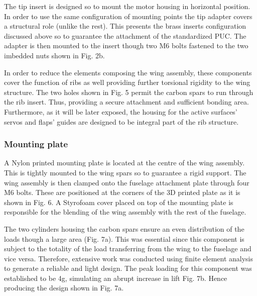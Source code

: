\documentclass[../../main.tex]{subfiles}
\begin{document}

The tip insert is designed so to mount the motor housing in horizontal position.
In order to use the same configuration of mounting points the tip adapter covers a structural role (unlike the rest).
This presents the brass inserts configuration discussed above so to guarantee the attachment of the standardized PUC.
The adapter is then mounted to the insert though two M6 bolts fastened to the two imbedded nuts shown in Fig. 2b. 

In order to reduce the elements composing the wing assembly, these components cover the function of ribs as well providing further torsional rigidity to the wing structure.
The two holes shown in Fig. 5 permit the carbon spars to run through the rib insert.
Thus, providing a secure attachment and sufficient bonding area.
Furthermore, as it will be later exposed, the housing for the active surfaces’ servos and flaps’ guides are designed to be integral part of the rib structure. 

\subsubsection{Mounting plate} \label{sec:design-process:final-design-proposal:wing:mounting-plate}

A Nylon printed mounting plate is located at the centre of the wing assembly.
This is tightly mounted to the wing spars so to guarantee a rigid support.
The wing assembly is then clamped onto the fuselage attachment plate through four M6 bolts.
These are positioned at the corners of the 3D printed plate as it is shown in Fig. 6.
A Styrofoam cover placed on top of the mounting plate is responsible for the blending of the wing assembly with the rest of the fuselage. 


The two cylinders housing the carbon spars ensure an even distribution of the loads though a large area (Fig. 7a).
This was essential since this component is subject to the totality of the load transferring from the wing to the fuselage and vice versa.
Therefore, extensive work was conducted using finite element analysis to generate a reliable and light design.
The peak loading for this component was established to be 4g, simulating an abrupt increase in lift Fig. 7b.
Hence producing the design shown in Fig. 7a. 
\end{document}
